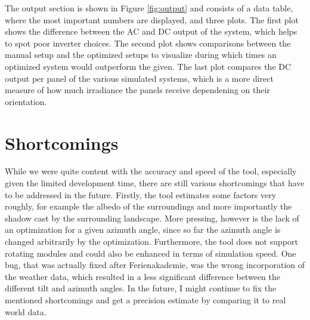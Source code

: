 \documentclass[12pt]{report}
\begin{document}
\noindent The output section is shown in Figure \ref{fig:output} and consists of a data table, where the most important numbers are displayed, and three plots.
The first plot shows the difference between the AC and DC output of the system, which helps to spot poor inverter choices. The second plot shows comparisons between the manual
setup and the optimized setups to visualize during which times an optimized system would outperform the given.
The last plot compares the DC output per panel of the various simulated systems, which is a more direct measure of how much irradiance the panels receive dependening on their orientation.
\section*{Shortcomings}
While we were quite content with the accuracy and speed of the tool, especially given the limited development time, there are still various shortcomings
that have to be addressed in the future. Firstly, the tool estimates some factors very roughly, for example the albedo of the surroundings and more importantly the shadow cast by the surrounding landscape.
More pressing, however is the lack of an optimization
for a given azimuth angle, since so far the azimuth angle is changed arbitrarily by the optimization. Furthermore, the tool does not support rotating modules and could also be enhanced in terms of 
simulation speed. One bug, that was actually fixed after Ferienakademie, was the wrong incorporation of the weather data, which resulted in a less significant difference between the different tilt
and azimuth angles. In the future, I might continue to fix the mentioned shortcomings and get a precision estimate by comparing it to real world data.




\end{document}
